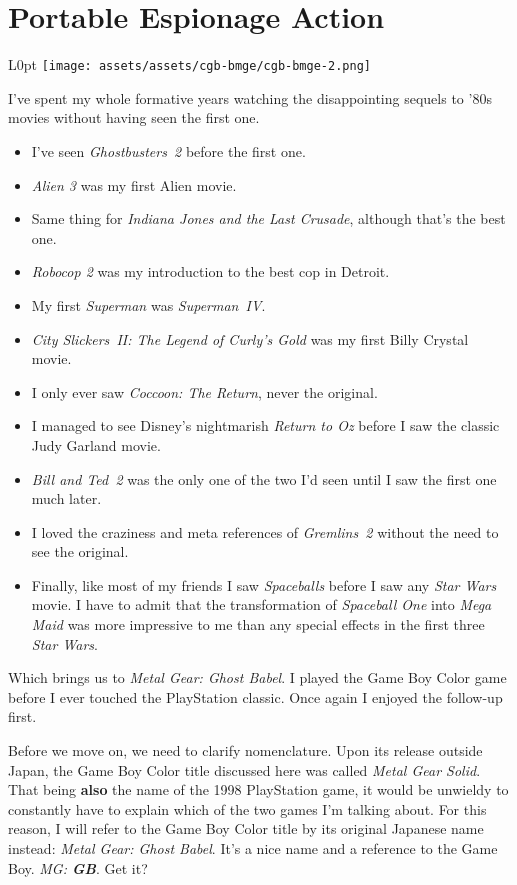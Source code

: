\documentclass{book}
\begin{document}
\newpage\FloatBarrier\needspace{10mm}\section*{Portable Espionage Action}\nopagebreak[4]
\begin{wrapfigure}{L}{0pt} \texttt{[image: assets/assets/cgb-bmge/cgb-bmge-2.png]}\end{wrapfigure}
I’ve spent my whole formative years watching the disappointing sequels to ’80s movies without having seen the first one.
\begin{itemize} [nosep]
\item I’ve seen \emph{Ghostbusters~2} before the first one.
\item \emph{Alien 3} was my first Alien movie.
\item Same thing for \emph{Indiana Jones and the Last Crusade}, although that’s the best one.
\item \emph{Robocop 2} was my introduction to the best cop in Detroit.
\item My first \emph{Superman} was \emph{Superman~IV}.
\item \emph{City Slickers~II: The Legend of Curly’s Gold} was my first Billy Crystal movie.
\item I only ever saw \emph{Coccoon: The Return}, never the original.
\item I managed to see Disney’s nightmarish \emph{Return to Oz} before I saw the classic Judy Garland movie.
\item \emph{Bill and Ted~2} was the only one of the two I’d seen until I saw the first one much later.
\item I loved the craziness and meta references of \emph{Gremlins~2} without the need to see the original.
\item Finally, like most of my friends I saw \emph{Spaceballs} before I saw any \emph{Star Wars} movie. I have to admit that the transformation of \emph{Spaceball One} into \emph{Mega Maid} was more impressive to me than any special effects in the first three \emph{Star Wars}.
\end{itemize}\noindent

Which brings us to \emph{Metal Gear: Ghost Babel}. I played the Game Boy Color game before I ever touched the PlayStation classic. Once again I enjoyed the follow-up first.

Before we move on, we need to clarify nomenclature. Upon its release outside Japan, the Game Boy Color title discussed here was called \emph{Metal Gear Solid}. That being \textbf{also} the name of the 1998 PlayStation game, it would be unwieldy to constantly have to explain which of the two games I’m talking about. For this reason, I will refer to the Game Boy Color title by its original Japanese name instead: \emph{Metal Gear: Ghost Babel}. It’s a nice name and a reference to the Game Boy. \emph{MG: \textbf{GB}}. Get it?
\end{document}
